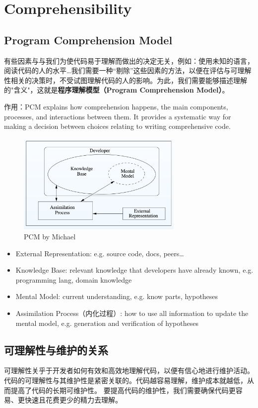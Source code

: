 \documentclass[]{ctexbook}
\begin{document}
\section{Comprehensibility}



\subsection{Program Comprehension Model}

有些因素与与我们为使代码易于理解而做出的决定无关，例如：使用未知的语言，阅读代码的人的水平\dots 我们需要一种“剔除”这些因素的方法，以便在评估与可理解性相关的决策时，不受试图理解代码的人的影响。为此，我们需要能够描述理解的"含义"，这就是\textbf{程序理解模型（Program Comprehension Model）}。

作用：PCM explains how comprehension happens, the main components, processes, and interactions between them. It provides a systematic way for making a decision between choices relating to writing comprehensive code.

\begin{figure}[h]
    \centering
    \includegraphics[width=8cm]{res/PCM.png}
    \caption{PCM by Michael}
\end{figure}

\begin{itemize}
    \item External Representation: e.g. source code, docs, peers\dots
    \item Knowledge Base: relevant knowledge that developers have already known, e.g. programming lang, domain knowledge
    \item Mental Model: current understanding, e.g. know parts, hypotheses
    \item Assimilation Process（内化过程）: how to use all information to update the mental model, e.g. generation and verification of hypotheses
\end{itemize}

\subsection{可理解性与维护的关系}
可理解性关乎于开发者如何有效和高效地理解代码，以便有信心地进行维护活动。代码的可理解性与其维护性是紧密关联的。代码越容易理解，维护成本就越低，从而提高了代码的长期可维护性。
要提高代码的维护性，我们需要确保代码更容易、更快速且花费更少的精力去理解。
\end{document}
